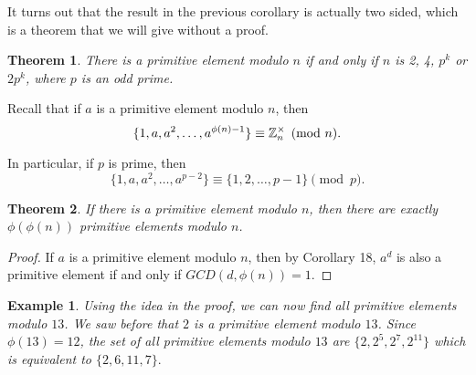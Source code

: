 \documentclass[12pt]{article}
\theoremstyle{plain}
\newtheorem{example}{Example}
\newtheorem{theorem}{Theorem}
\theoremstyle{definition}
\theoremstyle{remark}
\begin{document}
It turns out that the result in the previous corollary is actually two sided, which is a theorem that we will give without a proof.
\begin{theorem}
There is a primitive element modulo $n$ if and only if $n$ is 2, 4, $p^k$ or $2p^k$, where $p$ is an odd prime.
\end{theorem}

\bigskip
\noindent
Recall that if $a$ is a primitive element modulo $n$, then
$$\{1, a, a^2, \dots, a^{\phi(n)-1}\} \equiv \mathbb{Z}_n^{\times} \pmod{n}.$$

In particular, if $p$ is prime, then
$$\{1, a, a^2, \dots, a^{p-2}\} \equiv \{1,2, \dots, p-1\} \pmod{p}.$$

\bigskip
\noindent
\begin{theorem}
If there is a primitive element modulo $n$, then there are exactly $\phi(\phi(n))$ primitive elements modulo $n$.
\end{theorem}
\begin{proof}
If $a$ is a primitive element modulo $n$, then by Corollary 18, $a^d$ is also a primitive element if and only if $GCD(d, \phi(n))=1$.
\end{proof}
\begin{example}
Using the idea in the proof, we can now find all primitive elements modulo $13$. We saw before that $2$ is a primitive element modulo $13$. Since $\phi(13)=12$, the set of all primitive elements modulo $13$ are $\{2, 2^5, 2^7, 2^{11}\}$ which is equivalent to $\{2, 6, 11, 7\}. $
\end{example}
\end{document}
